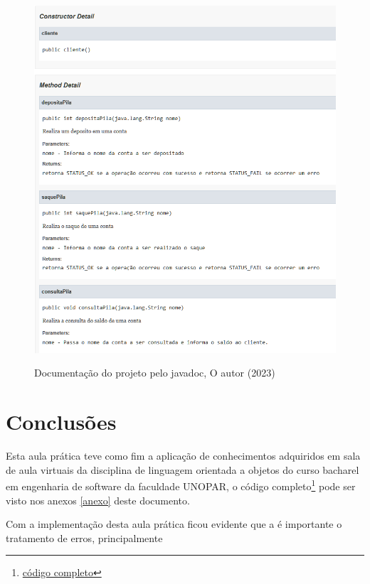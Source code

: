 \begin{figure}[H]
  \centering
  \includegraphics[width=\textwidth]{figure/java_doc.png}
  \label{fig:javadoc}
  \caption{Documentação do projeto pelo javadoc, O autor (2023)}
\end{figure}

\section{Conclusões}

\par Esta aula prática teve como fim a aplicação de conhecimentos adquiridos em sala de aula virtuais da disciplina de linguagem orientada a objetos do curso bacharel em engenharia de software da faculdade UNOPAR, o código completo\footnote{\hyperref[anexo]{código completo}}  pode ser visto nos anexos \ref{anexo} deste documento.
\par Com a implementação desta aula prática ficou evidente que a é importante o tratamento de erros, principalmente

